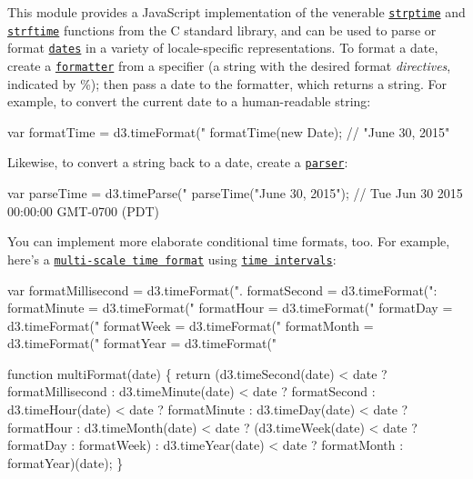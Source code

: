 This module provides a Java\+Script implementation of the venerable \href{http://pubs.opengroup.org/onlinepubs/009695399/functions/strptime.html}{\tt strptime} and \href{http://pubs.opengroup.org/onlinepubs/007908799/xsh/strftime.html}{\tt strftime} functions from the C standard library, and can be used to parse or format \href{https://developer.mozilla.org/en-US/docs/Web/JavaScript/Reference/Global_Objects/Date}{\tt dates} in a variety of locale-\/specific representations. To format a date, create a \href{#locale_format}{\tt formatter} from a specifier (a string with the desired format {\itshape directives}, indicated by {\ttfamily \%}); then pass a date to the formatter, which returns a string. For example, to convert the current date to a human-\/readable string\+:


\begin{DoxyCode}
var formatTime = d3.timeFormat("%
formatTime(new Date); // "June 30, 2015"
\end{DoxyCode}


Likewise, to convert a string back to a date, create a \href{#locale_parse}{\tt parser}\+:


\begin{DoxyCode}
var parseTime = d3.timeParse("%
parseTime("June 30, 2015"); // Tue Jun 30 2015 00:00:00 GMT-0700 (PDT)
\end{DoxyCode}


You can implement more elaborate conditional time formats, too. For example, here’s a \href{http://bl.ocks.org/mbostock/4149176}{\tt multi-\/scale time format} using \href{https://github.com/d3/d3-time}{\tt time intervals}\+:


\begin{DoxyCode}
var formatMillisecond = d3.timeFormat(".%
    formatSecond = d3.timeFormat(":%
    formatMinute = d3.timeFormat("%
    formatHour = d3.timeFormat("%
    formatDay = d3.timeFormat("%
    formatWeek = d3.timeFormat("%
    formatMonth = d3.timeFormat("%
    formatYear = d3.timeFormat("%

function multiFormat(date) \{
  return (d3.timeSecond(date) < date ? formatMillisecond
      : d3.timeMinute(date) < date ? formatSecond
      : d3.timeHour(date) < date ? formatMinute
      : d3.timeDay(date) < date ? formatHour
      : d3.timeMonth(date) < date ? (d3.timeWeek(date) < date ? formatDay : formatWeek)
      : d3.timeYear(date) < date ? formatMonth
      : formatYear)(date);
\}
\end{DoxyCode}


